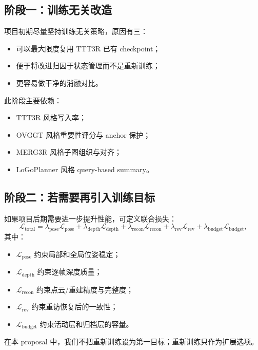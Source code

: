 \documentclass[12pt]{article}
\begin{document}
\subsection{阶段一：训练无关改造}

项目初期尽量坚持训练无关策略，原因有三：
\begin{itemize}
  \item 可以最大限度复用 TTT3R 已有 checkpoint；
  \item 便于将改进归因于状态管理而不是重新训练；
  \item 更容易做干净的消融对比。
\end{itemize}

此阶段主要依赖：
\begin{itemize}
  \item TTT3R 风格写入率；
  \item OVGGT 风格重要性评分与 anchor 保护；
  \item MERG3R 风格子图组织与对齐；
  \item LoGoPlanner 风格 query-based summary。
\end{itemize}

\subsection{阶段二：若需要再引入训练目标}

如果项目后期需要进一步提升性能，可定义联合损失：
\begin{equation}
\mathcal{L}_{\text{total}} =
\lambda_{\text{pose}}\mathcal{L}_{\text{pose}} +
\lambda_{\text{depth}}\mathcal{L}_{\text{depth}} +
\lambda_{\text{recon}}\mathcal{L}_{\text{recon}} +
\lambda_{\text{rev}}\mathcal{L}_{\text{rev}} +
\lambda_{\text{budget}}\mathcal{L}_{\text{budget}},
\end{equation}
其中：
\begin{itemize}
  \item $\mathcal{L}_{\text{pose}}$ 约束局部和全局位姿稳定；
  \item $\mathcal{L}_{\text{depth}}$ 约束逐帧深度质量；
  \item $\mathcal{L}_{\text{recon}}$ 约束点云/重建精度与完整度；
  \item $\mathcal{L}_{\text{rev}}$ 约束重访恢复后的一致性；
  \item $\mathcal{L}_{\text{budget}}$ 约束活动层和归档层的容量。
\end{itemize}

在本 proposal 中，我们不把重新训练设为第一目标；重新训练只作为扩展选项。
\end{document}
